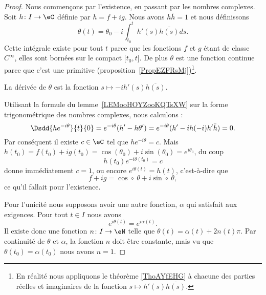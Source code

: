 	\begin{proof}
		Nous commençons par l'existence, en passant par les nombres complexes. Soit \( h\colon I\to \eC\) définie par \( h=f+ig\). Nous avons \( h\bar h=1\) et nous définissons
		\begin{equation}
			\theta(t)=\theta_0-i\int_{t_0}^th'(s)\overline{ h(s) }ds.
		\end{equation}
		Cette intégrale existe pour tout \( t\) parce que les fonctions \( f\) et \( g\) étant de classe \(  C^{\infty}\), elles sont bornées sur le compact \( \mathopen[ t_0 , t  \mathclose]\). De plus \( \theta\) est une fonction continue parce que c'est une primitive (proposition~\ref{PropEZFRsMj})\footnote{En réalité nous appliquons le théorème \ref{ThoAYfEHG} à chacune des parties réelles et imaginaires de la fonction $s\mapsto h'(s)\overline{ h(s) }$.}.

		La dérivée de \( \theta\) est la fonction \( s\mapsto -i h'(s)\overline{ h(s) }\).

		Utilisant la formule du lemme~\ref{LEMooHOYZooKQTsXW} sur la forme trigonométrique des nombres complexes, nous calculons :
		\begin{equation}
			\Dsdd{ h e^{-i\theta} }{t}{0}= e^{-i\theta}(h'-h\theta')= e^{-i\theta}(h'-ih(-i)h'\bar h)=0.
		\end{equation}
		Par conséquent il existe \( c\in \eC\) tel que \( h e^{-i\theta}=c\). Mais \( h(t_0)=f(t_0)+ig(t_0)=\cos(\theta_0)+i\sin(\theta_0)= e^{i\theta_0}\), du coup
		\begin{equation}
			h(t_0) e^{-i\theta(t_0)}=c
		\end{equation}
		donne immédiatement \( c=1\), ou encore \(  e^{i\theta(t)}=h(t)\), c'est-à-dire que
		\begin{equation}
			f+ig=\cos\circ\ \theta+i\sin\circ\ \theta,
		\end{equation}
		ce qu'il fallait pour l'existence.

		Pour l'unicité nous supposons avoir une autre fonction, \(\alpha\) qui satisfait aux exigences. Pour tout \( t\in I\) nous avons
		\begin{equation}
			e^{i\theta(t)}= e^{i\alpha(t)}.
		\end{equation}
		Il existe donc une fonction \( n\colon I\to \eN\) telle que \( \theta(t)=\alpha(t)+2n(t)\pi\). Par continuité de \( \theta\) et \( \alpha\), la fonction \( n\) doit être constante, mais vu que \( \theta(t_0)=\alpha(t_0)\) nous avons \( n=1\).
	\end{proof}


